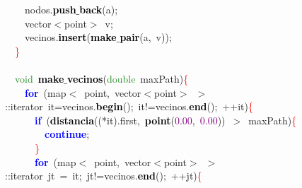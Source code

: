 \documentclass[10pt,a4paper,twoside]{article}
\begin{document}
{{{{{\mbox{}\ \ \ \ nodos\textcolor{BrickRed}{.}\textbf{\textcolor{Black}{push$\_$back}}\textcolor{BrickRed}{(}a\textcolor{BrickRed}{);} \\
\mbox{}\ \ \ \ vector\textcolor{BrickRed}{$<$}point\textcolor{BrickRed}{$>$}\ v\textcolor{BrickRed}{;} \\
\mbox{}\ \ \ \ vecinos\textcolor{BrickRed}{.}\textbf{\textcolor{Black}{insert}}\textcolor{BrickRed}{(}\textbf{\textcolor{Black}{make$\_$pair}}\textcolor{BrickRed}{(}a\textcolor{BrickRed}{,}\ v\textcolor{BrickRed}{));} \\
\mbox{}\ \ \textcolor{Red}{\}} \\
\mbox{} \\
\mbox{}\ \ \textcolor{ForestGreen}{void}\ \textbf{\textcolor{Black}{make$\_$vecinos}}\textcolor{BrickRed}{(}\textcolor{ForestGreen}{double}\ maxPath\textcolor{BrickRed}{)}\textcolor{Red}{\{} \\
\mbox{}\ \ \ \ \textbf{\textcolor{Blue}{for}}\ \textcolor{BrickRed}{(}map\textcolor{BrickRed}{$<$}\ point\textcolor{BrickRed}{,}\ vector\textcolor{BrickRed}{$<$}point\textcolor{BrickRed}{$>$}\ \textcolor{BrickRed}{$>$::}iterator\ it\textcolor{BrickRed}{=}vecinos\textcolor{BrickRed}{.}\textbf{\textcolor{Black}{begin}}\textcolor{BrickRed}{();}\ it\textcolor{BrickRed}{!=}vecinos\textcolor{BrickRed}{.}\textbf{\textcolor{Black}{end}}\textcolor{BrickRed}{();}\ \textcolor{BrickRed}{++}it\textcolor{BrickRed}{)}\textcolor{Red}{\{} \\
\mbox{}\ \ \ \ \ \ \textbf{\textcolor{Blue}{if}}\ \textcolor{BrickRed}{(}\textbf{\textcolor{Black}{distancia}}\textcolor{BrickRed}{((*}it\textcolor{BrickRed}{).}first\textcolor{BrickRed}{,}\ \textbf{\textcolor{Black}{point}}\textcolor{BrickRed}{(}\textcolor{Purple}{0.00}\textcolor{BrickRed}{,}\ \textcolor{Purple}{0.00}\textcolor{BrickRed}{))}\ \textcolor{BrickRed}{$>$}\ maxPath\textcolor{BrickRed}{)}\textcolor{Red}{\{} \\
\mbox{}\ \ \ \ \ \ \ \ \textbf{\textcolor{Blue}{continue}}\textcolor{BrickRed}{;} \\
\mbox{}\ \ \ \ \ \ \textcolor{Red}{\}} \\
\mbox{}\ \ \ \ \ \ \textbf{\textcolor{Blue}{for}}\ \textcolor{BrickRed}{(}map\textcolor{BrickRed}{$<$}\ point\textcolor{BrickRed}{,}\ vector\textcolor{BrickRed}{$<$}point\textcolor{BrickRed}{$>$}\ \textcolor{BrickRed}{$>$::}iterator\ jt\ \textcolor{BrickRed}{=}\ it\textcolor{BrickRed}{;}\ jt\textcolor{BrickRed}{!=}vecinos\textcolor{BrickRed}{.}\textbf{\textcolor{Black}{end}}\textcolor{BrickRed}{();}\ \textcolor{BrickRed}{++}jt\textcolor{BrickRed}{)}\textcolor{Red}{\{} \\
}}}}}
\end{document}
